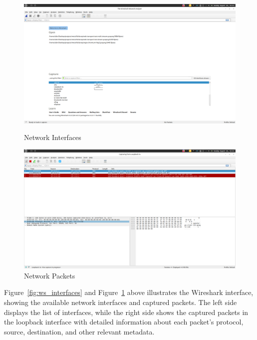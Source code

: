 \begin{figure}[H]
\centering
\begin{minipage}{0.9\textwidth}
  \centering
  \includegraphics[width=\textwidth]{SOA/ws_interfaces.png}
  \caption{Network Interfaces}
  \label{fig:ws_interfaces} %
\end{minipage}
\hfill
\begin{minipage}{0.9\textwidth}
  \centering
  \includegraphics[width=\textwidth]{SOA/ws_packets.png}
  \caption{Network Packets}
  \label{fig:ws_packets} %
\end{minipage}
\end{figure}

Figure~\ref{fig:ws_interfaces} and Figure~\ref{fig:ws_packets} above illustrates the Wireshark interface, showing the available network interfaces and captured packets. The left side displays the list of interfaces, while the right side shows the captured packets in the loopback interface with detailed information about each packet's protocol, source, destination, and other relevant metadata.

